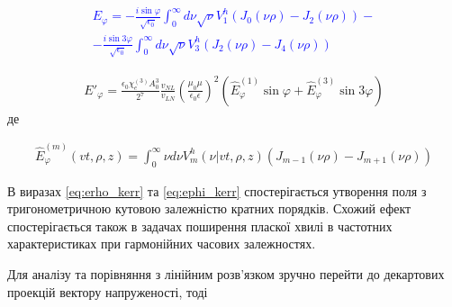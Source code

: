 \textcolor{blue} { \begin{equation*} \begin{aligned}
E_\varphi =
- \frac{i \sin \varphi}{\sqrt{\epsilon_0}} \int_0^\infty d \nu
\sqrt{\nu} V_1^h \left( J_0 (\nu \rho) - J_2 (\nu \rho) \right) - \\
- \frac{i \sin 3 \varphi}{\sqrt{\epsilon_0}} \int_0^\infty d \nu
\sqrt{\nu} V_3^h \left( J_2 (\nu \rho) - J_4 (\nu \rho) \right)
\end{aligned} \end{equation*} }

\begin{equation} \begin{aligned} \label{eq:ephi_kerr}
E'_\varphi = \frac{\epsilon_0 \chi_e^{(3)} A_0^3}{2^7}
\frac{v_{NL}}{v_{LN}}
\left( \frac{\mu_0 \mu}{\epsilon_0 \epsilon} \right)^2
\left(\hat{E}_\varphi^{(1)} \sin \varphi +
\hat{E}_\varphi^{(3)} \sin 3 \varphi \right)
\end{aligned} \end{equation}
%
де 

\begin{equation} \begin{aligned} \label{eq:ephi_norm}
\hat{E}_\varphi^{(m)} (vt, \rho, z) = 
\int_0^\infty \nu d \nu V_m^h (\nu | vt, \rho, z)
\left( J_{m-1} (\nu \rho) - J_{m+1} (\nu \rho) \right)
\end{aligned} \end{equation}

В виразах \eqref{eq:erho_kerr} та \eqref{eq:ephi_kerr} спостерігається
утворення поля з тригонометричною кутовою залежністю кратних порядків.
Схожий ефект спостерігається також в задачах поширення пласкої 
хвилі в частотних характеристиках при гармонійних часових залежностях.

Для аналізу та порівняння з лінійним розв'язком зручно перейти до 
декартових проекцій вектору напруженості, тоді


